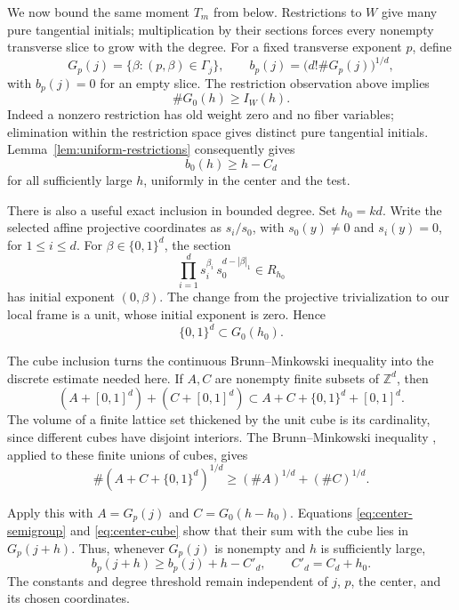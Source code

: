 We now bound the same moment $T_m$ from below. Restrictions to $W$
give many pure tangential initials; multiplication by their sections
forces every nonempty transverse slice to grow with the degree.
For a fixed transverse exponent $p$, define
\[
 G_p(j)=\{\beta:(p,\beta)\in\Gamma_j\},
 \qquad b_p(j)=\bigl(d!\#G_p(j)\bigr)^{1/d},
\]
with $b_p(j)=0$ for an empty slice. The restriction observation above
implies
\[
 \#G_0(h)\ge I_W(h).
\]
Indeed a nonzero restriction has old weight zero and no fiber variables;
elimination within the restriction space gives distinct pure tangential
initials. Lemma~\ref{lem:uniform-restrictions} consequently gives
\begin{equation}\label{eq:center-pure-growth}
 b_0(h)\ge h-C_d
\end{equation}
for all sufficiently large $h$, uniformly in the center and the test.

There is also a useful exact inclusion in bounded degree. Set $h_0=kd$.
Write the selected affine projective coordinates as $s_i/s_0$, with
$s_0(y)\ne0$ and $s_i(y)=0$, for $1\le i\le d$. For
$\beta\in\{0,1\}^d$, the section
\[
 \prod_{i=1}^d s_i^{\beta_i}\,s_0^{d-|\beta|_1}\in R_{h_0}
\]
has initial exponent $(0,\beta)$. The change from the projective
trivialization to our local frame is a unit, whose initial exponent is
zero. Hence
\begin{equation}\label{eq:center-cube}
 \{0,1\}^d\subset G_0(h_0).
\end{equation}

The cube inclusion turns the continuous Brunn--Minkowski inequality
into the discrete estimate needed here. If $A,C$ are nonempty finite
subsets of $\mathbb Z^d$, then
\[
 (A+[0,1]^d)+(C+[0,1]^d)
 \subset A+C+\{0,1\}^d+[0,1]^d.
\]
The volume of a finite lattice set thickened by the unit cube is its
cardinality, since different cubes have disjoint interiors. The
Brunn--Minkowski inequality \cite[Theorem~4.1]{gardner2002}, applied to
these finite unions of cubes, gives
\begin{equation}\label{eq:discrete-bm}
 \#(A+C+\{0,1\}^d)^{1/d}
 \ge (\#A)^{1/d}+(\#C)^{1/d}.
\end{equation}

Apply this with $A=G_p(j)$ and $C=G_0(h-h_0)$. Equations
\eqref{eq:center-semigroup} and \eqref{eq:center-cube} show that
their sum with the cube lies in $G_p(j+h)$. Thus, whenever $G_p(j)$ is
nonempty and $h$ is sufficiently large,
\begin{equation}\label{eq:center-slice-growth}
 b_p(j+h)\ge b_p(j)+h-C'_d,
 \qquad C'_d=C_d+h_0.
\end{equation}
The constants and degree threshold remain independent of $j$, $p$, the
center, and its chosen coordinates.

